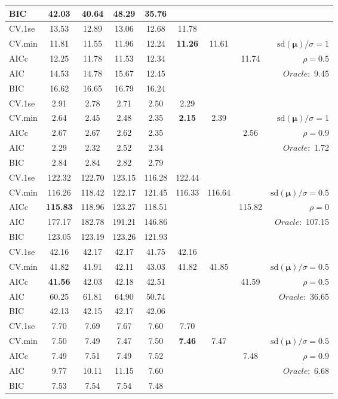\begin{table}
\begin{center}
\begin{tabular}{l*{7}{c}|r}
BIC & 42.03 & 40.64 & 48.29 & 35.76 & & & &  \\
 \hline 
CV.1se & 13.53 & 12.89 & 13.06 & 12.68 & 11.78 & & & \\
CV.min & 11.81 & 11.55 & 11.96 & 12.24 & {\bf 11.26} & 11.61 & & $\mathrm{sd}(\mathbf{\mu})/\sigma=1$ \\
AICc & 12.25 & 11.78 & 11.53 & 12.34 & & & 11.74 &  $\rho=0.5$ \\
AIC & 14.53 & 14.78 & 15.67 & 12.45 & & & &  \multirow{2}{*}{$Oracle: $ 9.45} \\
BIC & 16.62 & 16.65 & 16.79 & 16.24 & & & &  \\
 \hline 
CV.1se & 2.91 & 2.78 & 2.71 & 2.50 & 2.29 & & & \\
CV.min & 2.64 & 2.45 & 2.48 & 2.35 & {\bf 2.15} & 2.39 & & $\mathrm{sd}(\mathbf{\mu})/\sigma=1$ \\
AICc & 2.67 & 2.67 & 2.62 & 2.35 & & & 2.56 &  $\rho=0.9$ \\
AIC & 2.29 & 2.32 & 2.52 & 2.34 & & & &  \multirow{2}{*}{$Oracle: $ 1.72} \\
BIC & 2.84 & 2.84 & 2.82 & 2.79 & & & &  \\
 \hline 
CV.1se & 122.32 & 122.70 & 123.15 & 116.28 & 122.44 & & & \\
CV.min & 116.26 & 118.42 & 122.17 & 121.45 & 116.33 & 116.64 & & $\mathrm{sd}(\mathbf{\mu})/\sigma=0.5$ \\
AICc & {\bf 115.83} & 118.96 & 123.27 & 118.51 & & & 115.82 &  $\rho=0$ \\
AIC & 177.17 & 182.78 & 191.21 & 146.86 & & & &  \multirow{2}{*}{$Oracle: $ 107.15} \\
BIC & 123.05 & 123.19 & 123.26 & 121.93 & & & &  \\
 \hline 
CV.1se & 42.16 & 42.17 & 42.17 & 41.75 & 42.16 & & & \\
CV.min & 41.82 & 41.91 & 42.11 & 43.03 & 41.82 & 41.85 & & $\mathrm{sd}(\mathbf{\mu})/\sigma=0.5$ \\
AICc & {\bf 41.56} & 42.03 & 42.18 & 42.51 & & & 41.59 &  $\rho=0.5$ \\
AIC & 60.25 & 61.81 & 64.90 & 50.74 & & & &  \multirow{2}{*}{$Oracle: $ 36.65} \\
BIC & 42.13 & 42.15 & 42.17 & 42.06 & & & &  \\
 \hline 
CV.1se & 7.70 & 7.69 & 7.67 & 7.60 & 7.70 & & & \\
CV.min & 7.50 & 7.49 & 7.47 & 7.50 & {\bf 7.46} & 7.47 & & $\mathrm{sd}(\mathbf{\mu})/\sigma=0.5$ \\
AICc & 7.49 & 7.51 & 7.49 & 7.52 & & & 7.48 &  $\rho=0.9$ \\
AIC & 9.77 & 10.11 & 11.15 & 7.60 & & & &  \multirow{2}{*}{$Oracle: $ 6.68} \\
BIC & 7.53 & 7.54 & 7.54 & 7.48 & & & &  \\
 \hline 
\end{tabular}
\end{center}
\vspace{-1cm}
\end{table}




